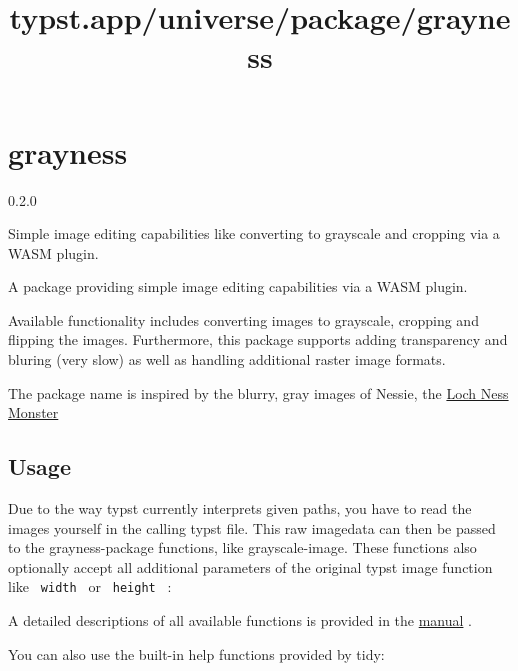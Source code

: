 \title{typst.app/universe/package/grayness}

\label{banner}
\section{grayness}\label{grayness}

{ 0.2.0 }

Simple image editing capabilities like converting to grayscale and
cropping via a WASM plugin.

\label{readme}
A package providing simple image editing capabilities via a WASM plugin.

Available functionality includes converting images to grayscale,
cropping and flipping the images. Furthermore, this package supports
adding transparency and bluring (very slow) as well as handling
additional raster image formats.

The package name is inspired by the blurry, gray images of Nessie, the
\href{https://en.wikipedia.org/wiki/Loch_Ness_Monster}{Loch Ness
Monster}

\subsection{Usage}\label{usage}

Due to the way typst currently interprets given paths, you have to read
the images yourself in the calling typst file. This raw imagedata can
then be passed to the grayness-package functions, like grayscale-image.
These functions also optionally accept all additional parameters of the
original typst image function like \texttt{\ width\ } or
\texttt{\ height\ } :

\begin{Shaded}
\begin{Highlighting}[]

\end{Highlighting}
\end{Shaded}

A detailed descriptions of all available functions is provided in the
\href{https://github.com/typst/packages/raw/main/packages/preview/grayness/0.2.0/manual.pdf}{manual}
.

You can also use the built-in help functions provided by tidy:

\begin{Shaded}
\begin{Highlighting}[]
\end{Highlighting}
\end{Shaded}

